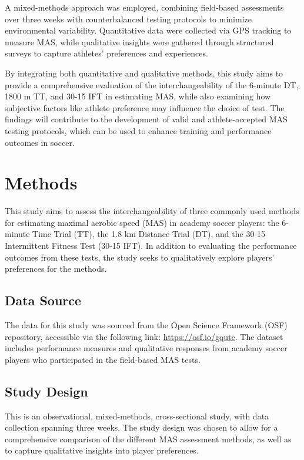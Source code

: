 \documentclass[
  man]{apa6}
\begin{document}
A mixed-methods approach was employed, combining field-based assessments over three weeks with counterbalanced testing protocols to minimize environmental variability. Quantitative data were collected via GPS tracking to measure MAS, while qualitative insights were gathered through structured surveys to capture athletes' preferences and experiences.

By integrating both quantitative and qualitative methods, this study aims to provide a comprehensive evaluation of the interchangeability of the 6-minute DT, 1800 m TT, and 30-15 IFT in estimating MAS, while also examining how subjective factors like athlete preference may influence the choice of test. The findings will contribute to the development of valid and athlete-accepted MAS testing protocols, which can be used to enhance training and performance outcomes in soccer.

\section{Methods}\label{methods}

This study aims to assess the interchangeability of three commonly used methods for estimating maximal aerobic speed (MAS) in academy soccer players: the 6-minute Time Trial (TT), the 1.8 km Distance Trial (DT), and the 30-15 Intermittent Fitness Test (30-15 IFT). In addition to evaluating the performance outcomes from these tests, the study seeks to qualitatively explore players' preferences for the methods.

\subsection{Data Source}\label{data-source}

The data for this study was sourced from the Open Science Framework (OSF) repository, accessible via the following link: \url{https://osf.io/gqutc}. The dataset includes performance measures and qualitative responses from academy soccer players who participated in the field-based MAS tests.

\subsection{Study Design}\label{study-design}

This is an observational, mixed-methods, cross-sectional study, with data collection spanning three weeks. The study design was chosen to allow for a comprehensive comparison of the different MAS assessment methods, as well as to capture qualitative insights into player preferences.
\end{document}
